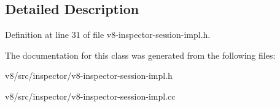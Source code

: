\subsection{Detailed Description}


Definition at line 31 of file v8-\/inspector-\/session-\/impl.\+h.



The documentation for this class was generated from the following files\+:\begin{DoxyCompactItemize}
\item 
v8/src/inspector/v8-\/inspector-\/session-\/impl.\+h\item 
v8/src/inspector/v8-\/inspector-\/session-\/impl.\+cc\end{DoxyCompactItemize}
